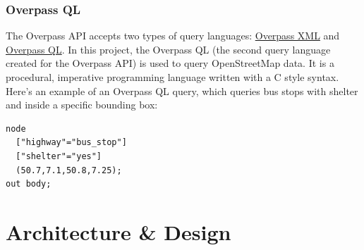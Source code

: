 \subsubsection{Overpass QL}
The Overpass API accepts two types of query languages: \href{https://wiki.openstreetmap.org/wiki/Overpass_API/Language_Guide#The_Overpass_API_languages}{Overpass XML}
and \href{https://wiki.openstreetmap.org/wiki/Overpass_API/Overpass_QL}{Overpass QL}.
In this project, the Overpass QL (the second query language created for the Overpass API) is used to query OpenStreetMap data.
It is a procedural, imperative programming language written with a C style syntax. \cite{WhatIsOverpassQL}\\
\newline
Here's an example of an Overpass QL query, which queries bus stops with shelter and inside a specific bounding box:\\
\begin{verbatim}
node
  ["highway"="bus_stop"]
  ["shelter"="yes"]
  (50.7,7.1,50.8,7.25);
out body;
\end{verbatim}
\section{Architecture \& Design}
